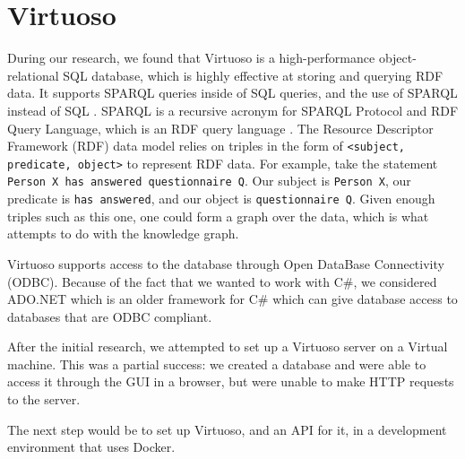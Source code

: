 \section{Virtuoso}
During our research, we found that Virtuoso is a high-performance object-relational SQL database, which is highly effective at storing and querying RDF data. It supports SPARQL queries inside of SQL queries, and the use of SPARQL instead of SQL \cite{VirtuosoDataAcces}. SPARQL is a recursive acronym for SPARQL Protocol and RDF Query Language, which is an RDF query language \cite{WhatIsSPARQL}.
The Resource Descriptor Framework (RDF) data model relies on triples in the form of \texttt{<subject, predicate, object>} to represent RDF data\cite{ResourceDescriptionFramework2021}. For example, take the statement \texttt{Person X has answered questionnaire Q}. Our subject is \texttt{Person X}, our predicate is \texttt{has answered}, and our object is \texttt{questionnaire Q}. Given enough triples such as this one, one could form a graph over the data, which is what \knox{} attempts to do with the knowledge graph.


Virtuoso supports access to the database through Open DataBase Connectivity (ODBC)\cite{VirtuosoODBC}.
Because of the fact that we wanted to work with C\#, we considered ADO.NET which is an older framework for C\# which can give database access to databases that are ODBC compliant\cite{AdoOdbc}.

After the initial research, we attempted to set up a Virtuoso server on a Virtual machine. This was a partial success: we created a database and were able to access it through the GUI in a browser, but were unable to make HTTP requests to the server.

The next step would be to set up Virtuoso, and an API for it, in a development environment that uses Docker.